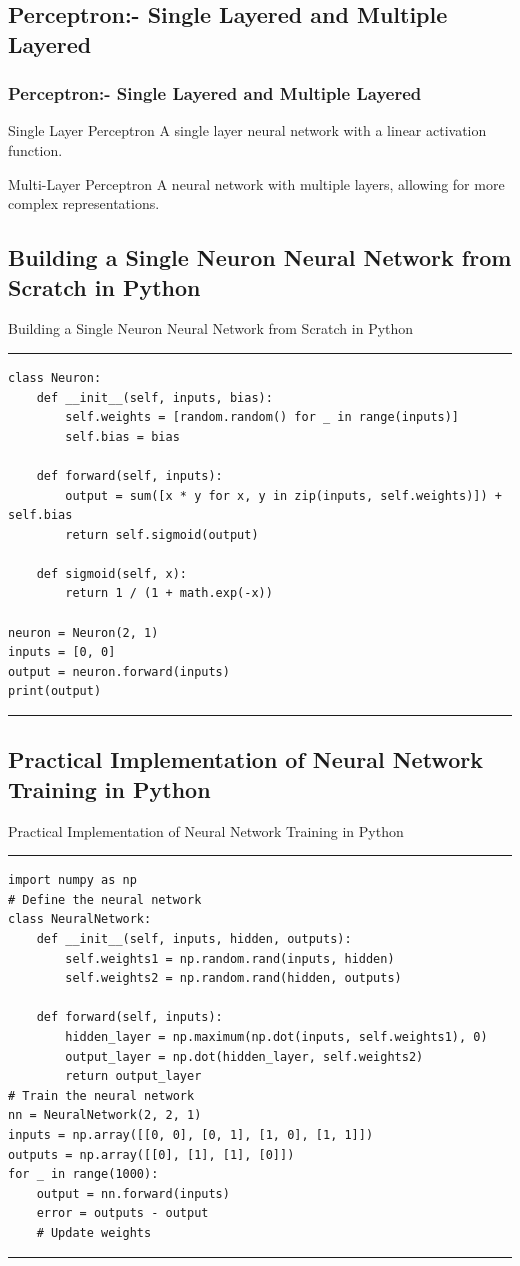 \documentclass[aspectratio=169, hideothersubsections]{beamer}
\begin{document}
\subsection{Perceptron:- Single Layered and Multiple Layered}
\begin{frame}
    \frametitle{Perceptron:- Single Layered and Multiple Layered}
    \begin{block}{Single Layer Perceptron}
        A single layer neural network with a linear activation function.
    \end{block}
    \begin{block}{Multi-Layer Perceptron}
        A neural network with multiple layers, allowing for more complex representations.
    \end{block}
\end{frame}

\subsection{Building a Single Neuron Neural Network from Scratch in Python}
\begin{frame}[fragile]{Building a Single Neuron Neural Network from Scratch in Python}
\rule{\textwidth}{1pt}
\scriptsize
\begin{verbatim}
class Neuron:
    def __init__(self, inputs, bias):
        self.weights = [random.random() for _ in range(inputs)]
        self.bias = bias

    def forward(self, inputs):
        output = sum([x * y for x, y in zip(inputs, self.weights)]) + self.bias
        return self.sigmoid(output)

    def sigmoid(self, x):
        return 1 / (1 + math.exp(-x))

neuron = Neuron(2, 1)
inputs = [0, 0]
output = neuron.forward(inputs)
print(output)
\end{verbatim}
\rule{\textwidth}{1pt}
\end{frame}

\subsection{Practical Implementation of Neural Network Training in Python}
\begin{frame}[fragile]{Practical Implementation of Neural Network Training in Python}
\rule{\textwidth}{1pt}
\scriptsize
\begin{verbatim}
import numpy as np
# Define the neural network
class NeuralNetwork:
    def __init__(self, inputs, hidden, outputs):
        self.weights1 = np.random.rand(inputs, hidden)
        self.weights2 = np.random.rand(hidden, outputs)

    def forward(self, inputs):
        hidden_layer = np.maximum(np.dot(inputs, self.weights1), 0)
        output_layer = np.dot(hidden_layer, self.weights2)
        return output_layer
# Train the neural network
nn = NeuralNetwork(2, 2, 1)
inputs = np.array([[0, 0], [0, 1], [1, 0], [1, 1]])
outputs = np.array([[0], [1], [1], [0]])
for _ in range(1000):
    output = nn.forward(inputs)
    error = outputs - output
    # Update weights
\end{verbatim}
\rule{\textwidth}{1pt}
\end{frame}
\end{document}
